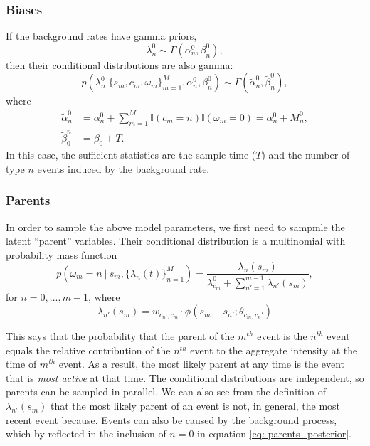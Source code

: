 		\subsubsection*{Biases}
			If the background rates have gamma priors,
			\begin{equation}
				\lambda_n^{0} \sim \Gamma(\alpha_n^0, \beta_n^0),
			\end{equation}
			then their conditional distributions are also gamma:
			\begin{equation}
				p(\lambda_n^{0} | \{s_m, c_m, \omega_m\}_{m=1}^M, \alpha_n^0, \beta_n^0) \sim \Gamma(\tilde{\alpha}_n^0, \tilde{\beta}_n^0),
			\end{equation}
			where
			\begin{align}
				\tilde{\alpha}_n^0 &= \alpha_n^0 + \sum_{m=1}^M \mathbb{I}(c_m=n) \mathbb{I}(\omega_m=0) = \alpha_n^0 + M_n^0, \\
				\tilde{\beta}_0^n &= \beta_0 + T.
			\end{align}
			In this case, the sufficient statistics are the sample time ($T$) and the number of type $n$ events induced by the background rate.

		\subsubsection*{Parents}
			In order to sample the above model parameters, we first need to sampmle the latent ``parent'' variables. Their conditional distribution is a multinomial with probability mass function
			\begin{equation} \label{eq: parents_posterior}
				p(\omega_m = n \ | \ s_m, \{ \lambda_n(t)\}_{n=1}^M) = \frac{\lambda_n(s_m)}{\lambda_{c_m}^0 + \sum_{n'=1}^{m - 1} \lambda_{n'}(s_m)},
			\end{equation}
			for $n = 0, \dots, m - 1$, where
			\begin{equation}
				\lambda_{n'}(s_m) = w_{c_{n'},c_m} \cdot \phi(s_m - s_{n'}; \theta_{c_m,c_n'})
			\end{equation}

			This says that the probability that the parent of the $m^{th}$ event is the $n^{th}$ event equals the relative contribution of the $n^{th}$ event to the aggregate intensity at the time of $m^{th}$ event. As a result, the most likely parent at any time is the event that is \textit{most active} at that time. The conditional distributions are independent, so parents can be sampled in parallel. We can also see from the definition of $\lambda_{n'}(s_m)$ that the most likely parent of an event is not, in general, the most recent event because. Events can also be caused by the background process, which by reflected in the inclusion of $n=0$ in equation \eqref{eq: parents_posterior}.

